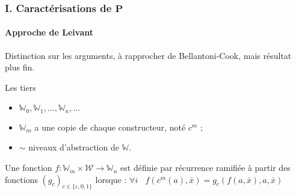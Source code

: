 \documentclass[10pt]{beamer}
\newcommand{\bbW}{\mathbb{W}}
\begin{document}
	\begin{frame}
		\frametitle{I. Caractérisations de $\textbf{P}$}
		\framesubtitle{Approche de Leivant}
		
		
		Distinction sur les arguments, à rapprocher de Bellantoni-Cook, mais résultat plus fin. 
		
		\pause
		
		\begin{block}{Les tiers}
			\begin{itemize}
				\item 	$\bbW_0, \bbW_1, \dots, \bbW_n, \dots$
				\item 	$\bbW_m$ a une copie de chaque constructeur, noté $c^m$ ;
				\item 	$\sim$ niveaux d'abstraction de $\bbW$.
			\end{itemize}
		\end{block}
		
		\pause 
		
		\begin{defn}
			Une fonction $f: \bbW_m \times \mathcal{W} \to \bbW_n$ est définie par récurrence ramifiée à partir des fonctions $\left( g_{c} \right)_{c \in \{\varepsilon, 0, 1\}}$ lorsque :
			$\forall i \:\:\:\:
				f(c^m(a), \bar{x}) 
				= g_{c}\left( f(a, \bar{x}), a, \bar{x} \right)
				$
		\end{defn}
	\end{frame}
%			
%			
%	
%		
%		
\end{document}
